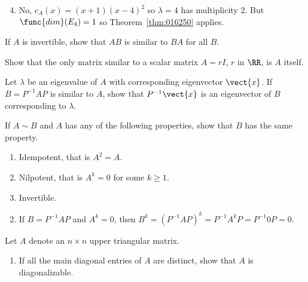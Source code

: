 \begin{multicols}{2}
\begin{ex}
\begin{sol}
\begin{enumerate}[label={\alph*.}]
\setcounter{enumi}{3}
\item  No, $c_{A}(x) = (x + 1)(x - 4)^{2}$ so $\lambda = 4$ has multiplicity 2. But $\func{dim}(E_{4}) = 1$ so Theorem~\ref{thm:016250} applies.

\end{enumerate}
\end{sol}
\end{ex}

\begin{ex}
If $A$ is invertible, show that $AB$ is similar to $BA$ for all $B$.
\end{ex}

\begin{ex}
Show that the only matrix similar to a scalar matrix $A = rI$, $r$ in $\RR$, is $A$ itself.
\end{ex}

\begin{ex}
Let $\lambda$ be an eigenvalue of $A$ with corresponding eigenvector $\vect{x}$. If $B = P^{-1}AP$ is similar to $A$, show that $P^{-1}\vect{x}$ is an eigenvector of $B$ corresponding to $\lambda$.
\end{ex}

\begin{ex}
If $A \sim B$ and $A$ has any of the following properties, show that $B$ has the same property.

\begin{enumerate}[label={\alph*.}]
\item Idempotent, that is $A^{2} = A$.

\item Nilpotent, that is $A^{k} = 0$ for some $k \geq 1$.

\item Invertible.

\end{enumerate}
\begin{sol}
\begin{enumerate}[label={\alph*.}]
\setcounter{enumi}{1}
\item  If $B = P^{-1}AP$ and $A^{k} = 0$, then $B^{k} = (P^{-1}AP)^{k} = P^{-1}A^{k}P = P^{-1}0P = 0$.

\end{enumerate}
\end{sol}
\end{ex}

\begin{ex}
Let $A$ denote an $n \times n$ upper triangular matrix.

\begin{enumerate}[label={\alph*.}]
\item If all the main diagonal entries of $A$ are distinct, show that $A$ is diagonalizable.


\end{enumerate}
\end{ex}
\end{multicols}

